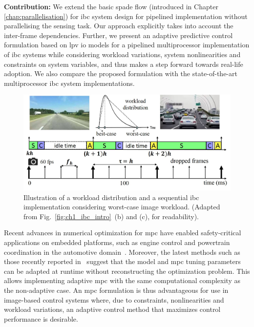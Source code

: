 \textbf{Contribution:} We extend the basic \gls{spade} flow (introduced in Chapter \ref{chap:parallelisation}) for \gls{ibc} system design for pipelined implementation without parallelising the sensing task. Our approach explicitly takes into account the inter-frame dependencies. Further, we present an adaptive predictive control formulation based on \gls{lpv} \gls{io} models for a pipelined multiprocessor implementation of \gls{ibc} systems while considering workload variations, system nonlinearities and constraints on system variables, and thus makes a step forward towards real-life adoption.
We also compare the proposed formulation with the state-of-the-art multiprocessor \gls{ibc} system implementations.

\begin{figure}
\centerline{
    \includegraphics[width=\textwidth]{images/ibc_workload.jpg}
    }
    \caption{Illustration of a workload distribution and a sequential \gls{ibc} implementation considering worst-case image workload. (Adapted from Fig.~\ref{fig:ch1_ibc_intro}~(b) and (c), for readability).
    }
    \label{fig:ch6_workload_IBC}
    \vspace{-2em}
\end{figure}

Recent advances in numerical optimization for \gls{mpc} have enabled safety-critical applications on embedded platforms, such as engine control and powertrain coordination in the automotive domain~\cite{GMODYS2018engine,GMODYS2018powertrain}. 
Moreover, the latest methods such as those recently reported in~\cite{sparseNMPC} suggest that the model and \gls{mpc} tuning parameters can be adapted at runtime without reconstructing the optimization problem. 
This allows implementing adaptive \gls{mpc} with the same computational complexity as the non-adaptive case.
An \gls{mpc} formulation is thus advantageous for use in image-based control systems where, due to constraints, nonlinearities and workload variations, an adaptive control method that maximizes control performance is desirable.
